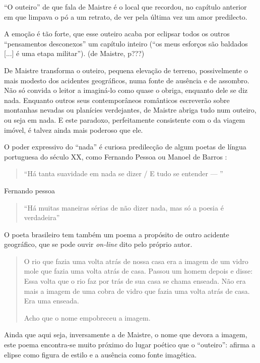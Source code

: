 \documentclass[12pt]{article}
\begin{document}
``O outeiro'' de que fala de Maistre é o local que recordou, no
capítulo anterior em que limpava o pó a um retrato, de ver pela última vez um amor predilecto. 

A emoção é tão forte, que esse outeiro acaba por eclipsar todos os outros ``pensamentos desconexos'' um capítulo inteiro (``os meus esforços são baldados [...] é uma etapa militar''). (de Maistre, p???)

De Maistre transforma o outeiro, pequena elevação de terreno, possivelmente o mais modesto dos acidentes geográficos, numa fonte de ausência e de assombro. Não só convida o leitor a imaginá-lo como quase o obriga, enquanto dele se diz nada. Enquanto outros seus contemporâneos românticos escreverão sobre montanhas nevadas ou planícies verdejantes, de Maistre abriga tudo num outeiro, ou seja em nada. E este paradoxo, perfeitamente consistente com o da viagem imóvel, é talvez ainda mais poderoso que ele.

O poder expressivo do ``nada'' é curiosa predilecção de algum poetas de língua portuguesa do século XX, como Fernando Pessoa ou Manoel de Barros \cite{manoel}:

\begin{quote}
  ``Há tanta suavidade em nada se dizer / E tudo se entender — ''
\end{quote}
Fernando pessoa

\begin{quote}
``Há muitas maneiras sérias de não dizer nada, mas só a poesia é verdadeira''
\end{quote}

O poeta brasileiro tem também um poema a propósito de outro acidente geográfico, que se pode ouvir \emph{on-line} dito pelo próprio autor.

\begin{quote}
  O rio que fazia uma volta atrás de nossa casa
era a imagem de um vidro mole que fazia uma
volta atrás de casa.
Passou um homem depois e disse: Essa volta
que o rio faz por trás de sua casa se chama
enseada.
Não era mais a imagem de uma cobra de vidro
que fazia uma volta atrás de casa.
Era uma enseada.

Acho que o nome empobreceu a imagem. 
\end{quote}

  Ainda que aqui seja, inversamente a de Maistre, o nome que devora a imagem, este poema encontra-se muito próximo do lugar poético que o ``outeiro'': afirma a elipse como figura de estilo e a ausência como fonte imagética.
\end{document}
